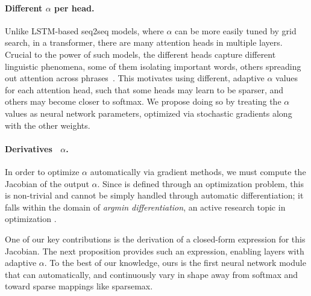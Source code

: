 \paragraph*{Different {\boldmath $\alpha$} per head.}
Unlike LSTM-based seq2seq models, where $\alpha$ can be more easily
tuned by grid search, in a transformer, there are many attention
heads in multiple layers. Crucial to the power of such models, the
different heads capture different linguistic phenomena, some of them
isolating important words, others spreading out attention across
phrases~\citep[Figure~5]{vaswani2017attention}. This motivates using
different, adaptive $\alpha$ values for each attention head, such
that some heads may learn to be sparser, and others may become closer
to softmax. We propose doing so by treating the $\alpha$ values as
neural network parameters, optimized via stochastic gradients along
with the other weights.

\paragraph*{Derivatives \wrt~{\boldmath $\alpha$}.}
In order to optimize $\alpha$ automatically via gradient methods, we
must compute the Jacobian of the \entmaxtext output \wrt $\alpha$.
Since \entmaxtext is defined through an optimization problem, this is
non-trivial and cannot be simply handled through automatic
differentiation; it falls within the domain of \emph{argmin
    differentiation}, an active research topic in optimization
\citep{gould,optnet}.

One of our key contributions is the derivation of a closed-form
expression for this Jacobian. The next proposition provides
such an expression, enabling \entmaxtext layers with
adaptive $\alpha$. To the best of our knowledge, ours is the first
neural network module that can automatically, and continuously vary in
shape away from softmax and toward sparse mappings like sparsemax.

